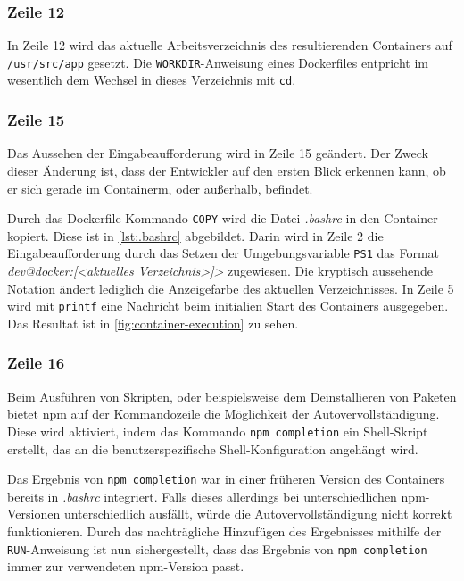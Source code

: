 \subsubsection{Zeile 12}
In Zeile 12 wird das aktuelle Arbeitsverzeichnis des resultierenden Containers auf \verb|/usr/src/app| gesetzt.
Die \verb|WORKDIR|-Anweisung eines Dockerfiles entpricht im wesentlich dem Wechsel in dieses Verzeichnis mit \verb|cd|.

\subsubsection {Zeile 15}
Das Aussehen der Eingabeaufforderung wird in Zeile 15 geändert.
Der Zweck dieser Änderung ist, dass der Entwickler auf den ersten Blick erkennen kann, ob er sich gerade im Containerm, oder außerhalb, befindet.

Durch das Dockerfile-Kommando \verb|COPY| wird die Datei \emph{.bashrc} in den Container kopiert.
Diese ist in \cref{lst:.bashrc} abgebildet.
Darin wird in Zeile 2 die Eingabeaufforderung durch das Setzen der Umgebungsvariable \verb|PS1| das Format \emph{dev@docker:[<aktuelles Verzeichnis>]>} zugewiesen.
Die kryptisch aussehende Notation ändert lediglich die Anzeigefarbe des aktuellen Verzeichnisses.
In Zeile 5 wird mit \verb|printf| eine Nachricht beim initialien Start des Containers ausgegeben.
Das Resultat ist in \cref{fig:container-execution} zu sehen.

\subsubsection {Zeile 16}
Beim Ausführen von Skripten, oder beispielsweise dem Deinstallieren von Paketen bietet npm auf der Kommandozeile die Möglichkeit der Autovervollständigung.
Diese wird aktiviert, indem das Kommando \verb|npm completion| ein Shell-Skript erstellt, das an die benutzerspezifische Shell-Konfiguration angehängt wird.

Das Ergebnis von \verb|npm completion| war in einer früheren Version des Containers bereits in \emph{.bashrc} integriert.
Falls dieses allerdings bei unterschiedlichen npm-Versionen unterschiedlich ausfällt, würde die Autovervollständigung nicht korrekt funktionieren.
Durch das nachträgliche Hinzufügen des Ergebnisses mithilfe der \verb|RUN|-Anweisung ist nun sichergestellt, dass das Ergebnis von \verb|npm completion| immer zur verwendeten npm-Version passt.

